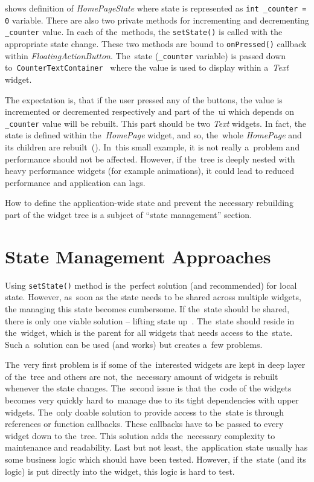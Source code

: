  shows definition of \textit{HomePageState} where state is represented as \verb|int _counter = 0| variable. There are also two private methods for incrementing and decrementing \verb|_counter| value. In each of the~methods, the \verb|setState()| is called with the appropriate state change.  These two methods are bound to \verb|onPressed()| callback within \textit{FloatingActionButton}. The~state (\verb|_counter| variable) is passed down to~\verb|CounterTextContainer|~ where the value is used to display within a~\textit{Text} widget. 

The expectation is, that if the user pressed any of the buttons, the value is incremented or decremented respectively and part of the~\gls{ui} which depends on \verb|_counter| value will be rebuilt. This part should be two \textit{Text} widgets. In fact, the state is defined within the~\textit{HomePage} widget, and so, the~whole \textit{HomePage} and its children are rebuilt~(). In~this small example, it is not really a~problem and performance should not be affected. However, if the~tree is deeply nested with heavy performance widgets (for example animations), it could lead to reduced performance and application can lags. 

How to define the application-wide state and prevent the necessary rebuilding part of the widget tree is a subject of ``state management'' section.
\section{State Management Approaches}
Using \verb|setState()| method is the~perfect solution (and recommended) for local state. However, as~soon as the state needs to be shared across multiple widgets, the managing this state becomes cumbersome. If the~state should be shared, there is only one viable solution -- lifting state up~\cite{flutter-simple-state-management}. The~state should reside in the~widget, which is the parent for all widgets that needs access to the~state. Such a~solution can be used (and works) but creates a~few problems. 

The~very first problem is if some of the~interested widgets are kept in deep layer of the~tree and others are not, the~necessary amount of widgets is rebuilt whenever the state changes. The~second issue is that the~code of the widgets becomes very quickly hard to~manage due to its tight dependencies with upper widgets. The~only doable solution to provide access to the~state is through references or function callbacks. These callbacks have to be passed to every widget down to the~tree. This solution adds the~necessary complexity to maintenance and readability. Last but not least, the~application state usually has some business logic which should have been tested. However, if the~state (and its logic) is put directly into the widget, this logic is hard to test. 

